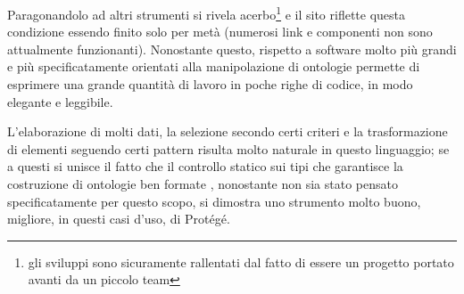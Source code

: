 Paragonandolo ad altri strumenti si rivela acerbo\footnote{gli sviluppi sono sicuramente rallentati dal fatto di essere un progetto portato avanti da un piccolo team} e il sito riflette questa condizione essendo finito solo per metà (numerosi link e componenti non sono attualmente funzionanti). Nonostante questo, rispetto a software molto più grandi e più specificatamente orientati alla manipolazione di ontologie \cduce permette di esprimere una grande quantità di lavoro in poche righe di codice, in modo elegante e leggibile. 

L'elaborazione di molti dati, la selezione secondo certi criteri e la trasformazione di elementi seguendo certi pattern risulta molto naturale in questo linguaggio; se a questi si unisce il fatto che il controllo statico sui tipi che garantisce la costruzione di ontologie ben formate \cduce, nonostante non sia stato pensato specificatamente per questo scopo, si dimostra uno strumento molto buono, migliore, in questi casi d'uso, di Protégé.